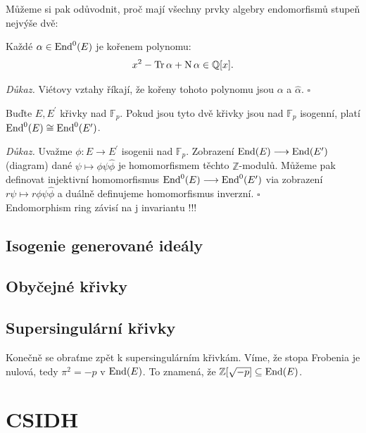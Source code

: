 \documentclass [12pt]{report}
\begin{document}
Můžeme si pak odůvodnit, proč mají všechny prvky algebry endomorfismů stupeň nejvýše dvě:
\begin{veta}
Každé $\alpha \in \operatorname{End}^0 (E)$ je kořenem polynomu:
\begin{equation*}
x^2 - \operatorname{Tr} \alpha + \operatorname{N} \alpha \in \mathbb{Q}[x].
\end{equation*}
\end{veta}
\noindent \textit{Důkaz.} Viétovy vztahy říkají, že kořeny tohoto polynomu jsou $\alpha$ a $\widehat{\alpha}$. \hfill $\square$\\

\begin{veta}
Buďte $E,E^\prime$ křivky nad $\mathbb{F}_p$. Pokud jsou tyto dvě křivky jsou nad $\mathbb{F}_p$ isogenní, platí $\operatorname{End}^0 (E) \cong \operatorname{End}^0 (E^\prime)$.
\end{veta}
\noindent \textit{Důkaz.} Uvažme $\phi : E \longrightarrow E^\prime$ isogenii nad $\mathbb{F}_p$. Zobrazení $\operatorname{End} (E) \longrightarrow \operatorname{End} (E^\prime)$ (diagram) dané $\psi \mapsto \phi \psi \widehat{\phi}$ je homomorfismem těchto $\mathbb{Z}$-modulů. Můžeme pak definovat injektivní homomorfismus $\operatorname{End}^0 (E) \longrightarrow \operatorname{End}^0 (E^\prime)$ via zobrazení $r \psi \mapsto r \phi \psi \widehat{\phi}$ a duálně definujeme homomorfismus inverzní. \hfill $\square$\\

Endomorphism ring závisí na j invariantu !!!

\section{Isogenie generované ideály}


\section{Obyčejné křivky}

\section{Supersingulární křivky}

Konečně se obraťme zpět k supersingulárním křivkám. Víme, že stopa Frobenia je nulová, tedy $\pi^2 = -p$ v $\operatorname{End}(E)$. To znamená, že $\mathbb{Z}[\sqrt{-p}] \subseteq \operatorname{End}(E)$.

\chapter{CSIDH}
\end{document}
